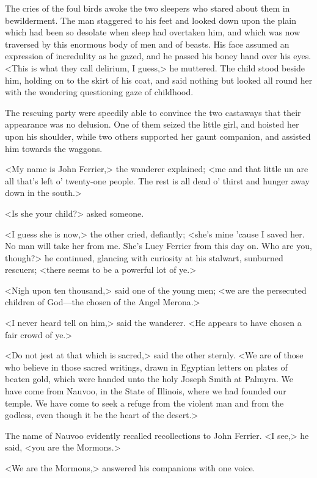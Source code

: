 The cries of the foul birds awoke the two sleepers who stared about them in bewilderment. The man staggered to his feet and looked down upon the plain which had been so desolate when sleep had overtaken him, and which was now traversed by this enormous body of men and of beasts. His face assumed an expression of incredulity as he gazed, and he passed his boney hand over his eyes. <This is what they call delirium, I guess,> he muttered. The child stood beside him, holding on to the skirt of his coat, and said nothing but looked all round her with the wondering questioning gaze of childhood.

The rescuing party were speedily able to convince the two castaways that their appearance was no delusion. One of them seized the little girl, and hoisted her upon his shoulder, while two others supported her gaunt companion, and assisted him towards the waggons.

<My name is John Ferrier,> the wanderer explained; <me and that little un are all that's left o' twenty-one people. The rest is all dead o' thirst and hunger away down in the south.>

<Is she your child?> asked someone.

<I guess she is now,> the other cried, defiantly; <she's mine 'cause I saved her. No man will take her from me. She's Lucy Ferrier from this day on. Who are you, though?> he continued, glancing with curiosity at his stalwart, sunburned rescuers; <there seems to be a powerful lot of ye.>

<Nigh upon ten thousand,> said one of the young men; <we are the persecuted children of God—the chosen of the Angel Merona.>

<I never heard tell on him,> said the wanderer. <He appears to have chosen a fair crowd of ye.>

<Do not jest at that which is sacred,> said the other sternly. <We are of those who believe in those sacred writings, drawn in Egyptian letters on plates of beaten gold, which were handed unto the holy Joseph Smith at Palmyra. We have come from Nauvoo, in the State of Illinois, where we had founded our temple. We have come to seek a refuge from the violent man and from the godless, even though it be the heart of the desert.>

The name of Nauvoo evidently recalled recollections to John Ferrier. <I see,> he said, <you are the Mormons.>

<We are the Mormons,> answered his companions with one voice.

